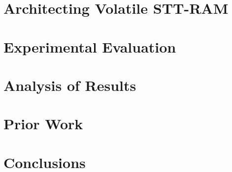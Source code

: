 \documentclass[12pt,letterpaper]{article}
\begin{document}
\section{Architecting Volatile STT-RAM} \label{sec:implementation}

\section{Experimental Evaluation} \label{sec:evaluation}

\section{Analysis of Results} \label{sec:results}

\section{Prior Work} \label{sec:prior_work}

\section{Conclusions} \label{sec:conclusions}






{
\singlespacing
{\small


}
}
\end{document}
